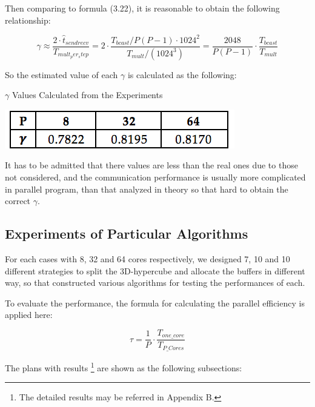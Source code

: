 \documentclass{amsart}
\theoremstyle{definition}
\theoremstyle{remark}
\numberwithin{equation}{section}
\begin{document}
		Then comparing to formula (3.22), it is reasonable to obtain the following relationship:

\begin{equation}
\gamma \approx \frac{2 \cdot \hat{t}_{sendrecv}}{T_{mult_per_step}} = 2 \cdot \frac{T_{bcast} / P(P-1) \cdot 1024^2}{T_{mult}/(1024^3)} = \frac{2048}{P(P-1)} \cdot \frac{T_{bcast}}{T_{mult}}
\end{equation}

So the estimated value of each $\gamma$ is calculated as the following:

\begin{table}[h]
\caption{$\gamma$ Values Calculated from the Experiments}
\includegraphics[scale=0.8]{figures/table_2.png}
\end{table}
\par
It has to be admitted that there values are less than the real ones due to those not considered, and the communication performance is usually more complicated in parallel program, than that analyzed in theory so that hard to obtain the correct $\gamma$.

\subsection{Experiments of Particular Algorithms}

For each cases with 8, 32 and 64 cores respectively, we designed 7, 10 and 10 different strategies to split the 3D-hypercube and allocate the buffers in different way, so that constructed various algorithms for testing the performances of each. 

To evaluate the performance, the formula for calculating the parallel efficiency is applied here:

\begin{equation}
\tau = \frac{1}{P} \cdot \frac{T_{one \_ core}}{T_{P \_ Cores}}
\end{equation}

The plans with results%
\footnote{The detailed results may be referred in Appendix B.}%
 are shown as the following subsections:
\end{document}
